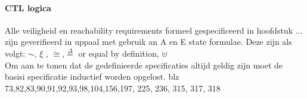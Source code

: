 \cite{audioSemanticsBengtsson}
\cite{guidingAutomataBberm}
\cite{gearTransitionLindahl1}
\cite{gearTransitionLindahl2}
\cite{martinelliScada}
\cite{IgbalReconstructurintTransition1}
\cite{IgbalReconstructurintTransition2}
\cite{huangVerficationStoch}
\cite{bengtssonUppaalVerification}
\cite{pranaliVerificationWaterLevel}
\cite{alexandreUppaalDefinition}
\cite{behzadEvalQOS}
\cite{behzadVariablesQoS}
\cite{alur}
\cite{alurDenseRealTime}
\cite{alurSystemClok}
\cite{alurModelHybrid}
\cite{rijksoverheidSluizen}
\cite{rijksoverheidSluisStroomschema}

\paragraph{CTL logica}
Alle veiligheid en reachability requirements formeel gespecificeerd in hoofdstuk ... zijn geverifieerd in uppaal met gebruik an A en E state formulae. Deze zijn als volgt:
$\sim$, $\xi$ , $\cong$,$\overset{\Delta}{=}$ or equal by definition, $\uplus$
\newline \\
Om aan te tonen dat de gedefinieerde specificaties altijd geldig zijn moet de basisi specificatie inductief worden opgelost. \cite{latin06} blz 73,82,83,90,91,92,93,98,104,156,197, 225, 236, 315, 317, 318\cite[p.~318]{realtimeForms}  

